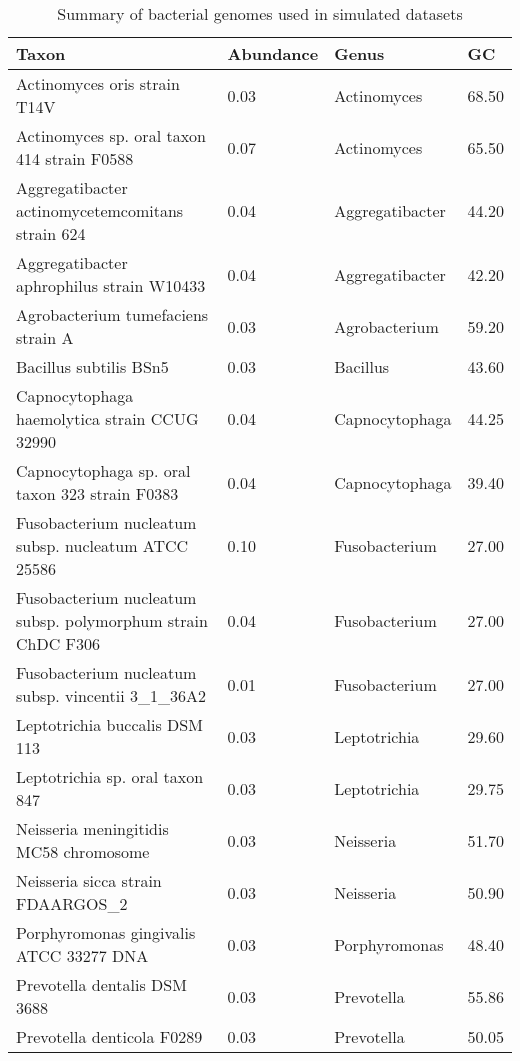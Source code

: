 \documentclass[12pt, a4paper]{article}
\renewcommand{\arraystretch}{1.2}
\newcommand{\ra}[1]{\renewcommand{\arraystretch}{#1}}
\begin{document}
\begin{table}[ht]
\centering\small
\ra{1.3}
\setlength{\tabcolsep}{6pt} %
\caption{Summary of bacterial genomes used in simulated datasets}\label{table:simGenomes}
\begin{tabular}{C{7.5cm} C{2.5cm} C{3cm} R{1.5cm} }
  \hline
 \textbf{Taxon} & \textbf{Abundance} & \textbf{Genus} & \textbf{GC} \\ 
  \hline
	Actinomyces oris strain T14V & 0.03 & Actinomyces & 68.50 \\ 
	Actinomyces sp. oral taxon 414 strain F0588 & 0.07 & Actinomyces & 65.50 \\ 
	Aggregatibacter actinomycetemcomitans strain 624 & 0.04 & Aggregatibacter & 44.20 \\ 
	Aggregatibacter aphrophilus strain W10433 & 0.04 & Aggregatibacter & 42.20 \\ 
	Agrobacterium tumefaciens strain A & 0.03 & Agrobacterium & 59.20 \\ 
	Bacillus subtilis BSn5 & 0.03 & Bacillus & 43.60 \\ 
	Capnocytophaga haemolytica strain CCUG 32990 & 0.04 & Capnocytophaga & 44.25 \\ 
	Capnocytophaga sp. oral taxon 323 strain F0383 & 0.04 & Capnocytophaga & 39.40 \\ 
	Fusobacterium nucleatum subsp. nucleatum ATCC 25586 & 0.10 & Fusobacterium & 27.00 \\ 
	Fusobacterium nucleatum subsp. polymorphum strain ChDC F306 & 0.04 & Fusobacterium &  27.00 \\ 
	Fusobacterium nucleatum subsp. vincentii 3\_1\_36A2 & 0.01 & Fusobacterium & 27.00 \\ 
	Leptotrichia buccalis DSM 113 & 0.03 & Leptotrichia & 29.60 \\ 
	Leptotrichia sp. oral taxon 847 & 0.03 & Leptotrichia & 29.75 \\ 
	Neisseria meningitidis MC58 chromosome & 0.03 & Neisseria & 51.70 \\ 
	Neisseria sicca strain FDAARGOS\_2 & 0.03 & Neisseria & 50.90 \\ 
	Porphyromonas gingivalis ATCC 33277 DNA & 0.03 & Porphyromonas & 48.40 \\ 
	Prevotella dentalis DSM 3688 & 0.03 & Prevotella & 55.86 \\ 
	Prevotella denticola F0289 & 0.03 & Prevotella & 50.05 \\ 

\end{tabular}
\end{table}
\end{document}
